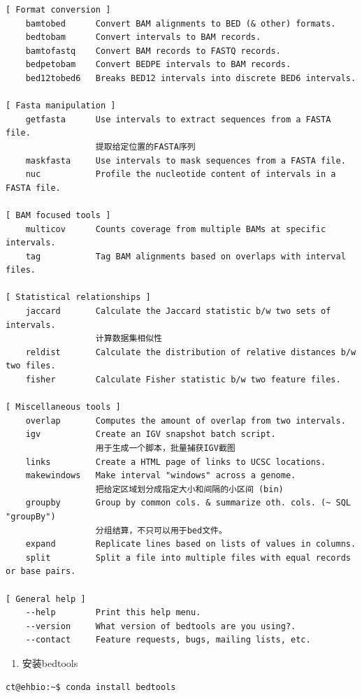 \documentclass[]{article}
\providecommand{\tightlist}{%
  \setlength{\itemsep}{0pt}\setlength{\parskip}{0pt}}
\numberwithin{figure}{section}
\numberwithin{table}{section}
\begin{document}
\begin{verbatim}
[ Format conversion ]
    bamtobed      Convert BAM alignments to BED (& other) formats.
    bedtobam      Convert intervals to BAM records.
    bamtofastq    Convert BAM records to FASTQ records.
    bedpetobam    Convert BEDPE intervals to BAM records.
    bed12tobed6   Breaks BED12 intervals into discrete BED6 intervals.

[ Fasta manipulation ]
    getfasta      Use intervals to extract sequences from a FASTA file.
	              提取给定位置的FASTA序列
    maskfasta     Use intervals to mask sequences from a FASTA file.
    nuc           Profile the nucleotide content of intervals in a FASTA file.

[ BAM focused tools ]
    multicov      Counts coverage from multiple BAMs at specific intervals.
    tag           Tag BAM alignments based on overlaps with interval files.

[ Statistical relationships ]
    jaccard       Calculate the Jaccard statistic b/w two sets of intervals.
	              计算数据集相似性
    reldist       Calculate the distribution of relative distances b/w two files.
    fisher        Calculate Fisher statistic b/w two feature files.

[ Miscellaneous tools ]
    overlap       Computes the amount of overlap from two intervals.
    igv           Create an IGV snapshot batch script.
				  用于生成一个脚本，批量捕获IGV截图
    links         Create a HTML page of links to UCSC locations.
    makewindows   Make interval "windows" across a genome.
	              把给定区域划分成指定大小和间隔的小区间 (bin)
    groupby       Group by common cols. & summarize oth. cols. (~ SQL "groupBy")
	              分组结算，不只可以用于bed文件。
    expand        Replicate lines based on lists of values in columns.
    split         Split a file into multiple files with equal records or base pairs.

[ General help ]
    --help        Print this help menu.
    --version     What version of bedtools are you using?.
    --contact     Feature requests, bugs, mailing lists, etc.
\end{verbatim}

\begin{enumerate}
\def\labelenumi{\arabic{enumi}.}
\tightlist
\item
  安装bedtools
\end{enumerate}

\begin{verbatim}
ct@ehbio:~$ conda install bedtools
\end{verbatim}
\end{document}
